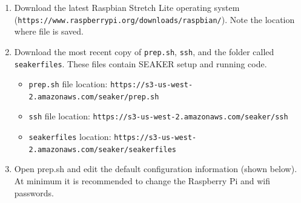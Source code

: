 \documentclass[12pt]{article}
\begin{document}
\begin{enumerate}
  \item Download the latest Raspbian Stretch Lite operating system\\
  ({\tt https://www.raspberrypi.org/downloads/raspbian/}).
  Note the location where file is saved.
  \item Download the most recent copy of  \verb|prep.sh|, {\tt \gls{ssh}}, and the 
  folder called \verb|seakerfiles|. These files
  contain SEAKER setup and running code.
    \begin{itemize}
      \item \verb|prep.sh| file location: {\tt https://s3-us-west-2.amazonaws.com/seaker/prep.sh}
      \item \verb|ssh| file location: {\tt https://s3-us-west-2.amazonaws.com/seaker/ssh}
      \item \verb|seakerfiles| location: {\tt https://s3-us-west-2.amazonaws.com/seaker/seakerfiles}
    \end{itemize}
  \item Open prep.sh and edit the default configuration information
  (shown below). At minimum it is recommended to change the Raspberry
  Pi and \gls{wifi} passwords.\\

  


\end{enumerate}
\end{document}
